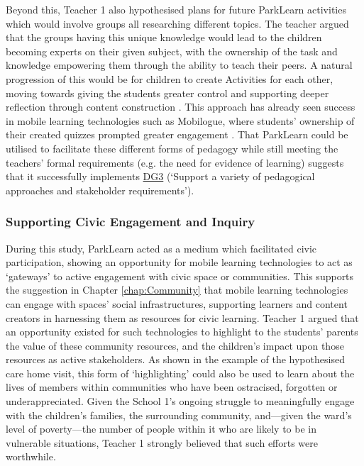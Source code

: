 Beyond this, Teacher 1 also hypothesised plans for future ParkLearn activities which would involve groups all researching different topics. The teacher argued that the groups having this unique knowledge would lead to the children becoming experts on their given subject, with the ownership of the task and knowledge empowering them through the ability to teach their peers. A natural progression of this would be for children to create Activities for each other, moving towards giving the students greater control and supporting deeper reflection through content construction \citep{Frohberg2009, Heslop2017}. This approach has already seen success in mobile learning technologies such as Mobilogue, where students’ ownership of their created quizzes prompted greater engagement \citep{Giemza2013}. That ParkLearn could be utilised to facilitate these different forms of pedagogy while still meeting the teachers' formal requirements (e.g. the need for evidence of learning) suggests that it successfully implements \hyperref[DG3]{DG3} (`Support a variety of pedagogical approaches and stakeholder requirements').

\subsubsection{Supporting Civic Engagement and Inquiry}

During this study, ParkLearn acted as a medium which facilitated civic participation, showing an opportunity for mobile learning technologies to act as `gateways' to active engagement with civic space or communities. This supports the suggestion in Chapter \ref{chap:Community} that mobile learning technologies can engage with spaces’ social infrastructures, supporting learners and content creators in harnessing them as resources for civic learning. Teacher 1 argued that an opportunity existed for such technologies to highlight to the students' parents the value of these community resources, and the children’s impact upon those resources as active stakeholders. As shown in the example of the hypothesised care home visit, this form of `highlighting' could also be used to learn about the lives of members within communities who have been ostracised, forgotten or underappreciated. Given the School 1's ongoing struggle to meaningfully engage with the children's families, the surrounding community, and---given the ward's level of poverty---the number of people within it who are likely to be in vulnerable situations, Teacher 1 strongly believed that such efforts were worthwhile.

